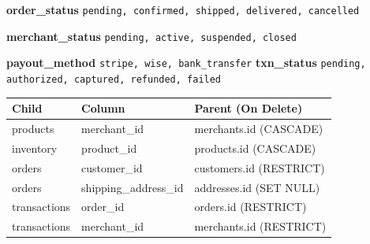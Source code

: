 \documentclass[8pt,a4paper]{extarticle}
\begin{document}
\begin{minipage}{0.48\textwidth}
  \begin{tcolorbox}[colback=white,colframe=secondary!50,sharp corners,boxrule=0.3pt,
    left=2mm,right=2mm,top=1.5mm,bottom=1.5mm,before skip=0pt,after skip=1pt]
    {\fontsize{7}{9}\selectfont\color{primary}\textbf{order\_status} \textbar{} \texttt{pending, confirmed, shipped, delivered, cancelled}}
  \end{tcolorbox}
  \begin{tcolorbox}[colback=white,colframe=secondary!50,sharp corners,boxrule=0.3pt,
    left=2mm,right=2mm,top=1.5mm,bottom=1.5mm,before skip=0pt,after skip=1pt]
    {\fontsize{7}{9}\selectfont\color{primary}\textbf{merchant\_status} \textbar{} \texttt{pending, active, suspended, closed}}
  \end{tcolorbox}
  \begin{tcolorbox}[colback=white,colframe=secondary!50,sharp corners,boxrule=0.3pt,
    left=2mm,right=2mm,top=1.5mm,bottom=1.5mm,before skip=0pt,after skip=1pt]
    {\fontsize{7}{9}\selectfont\color{primary}\textbf{payout\_method} \textbar{} \texttt{stripe, wise, bank\_transfer} \hspace{1em} \textbf{txn\_status} \textbar{} \texttt{pending, authorized, captured, refunded, failed}}
  \end{tcolorbox}
\end{minipage}
\par
\begin{minipage}{0.48\textwidth}
  \begin{tcolorbox}[schemaframe]
    \renewcommand{\arraystretch}{1.1}
    \begin{tabularx}{\linewidth}{p{2.3cm} p{2.5cm} X}
      \toprule
      \rowcolor{primary!10}\textbf{Child} & \textbf{Column} & \textbf{Parent (On Delete)} \\
      \midrule
      products     & merchant\_id          & merchants.id (CASCADE) \\
      inventory    & product\_id           & products.id (CASCADE) \\
      orders       & customer\_id          & customers.id (RESTRICT) \\
      orders       & shipping\_address\_id & addresses.id (SET NULL) \\
      transactions & order\_id             & orders.id (RESTRICT) \\
      transactions & merchant\_id          & merchants.id (RESTRICT) \\
      \bottomrule
    \end{tabularx}
  \end{tcolorbox}
\end{minipage}
\par
\end{document}
